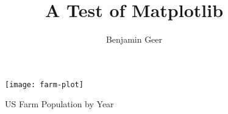 \documentclass[a4paper]{article}
\title{A Test of Matplotlib}
\author{Benjamin Geer}
\begin{document}
\maketitle

\begin{figure}[h]
\begin{center}
\texttt{[image: farm-plot]}
\caption{US Farm Population by Year}
\end{center}
\label{fig:farm}
\end{figure}
\end{document}
